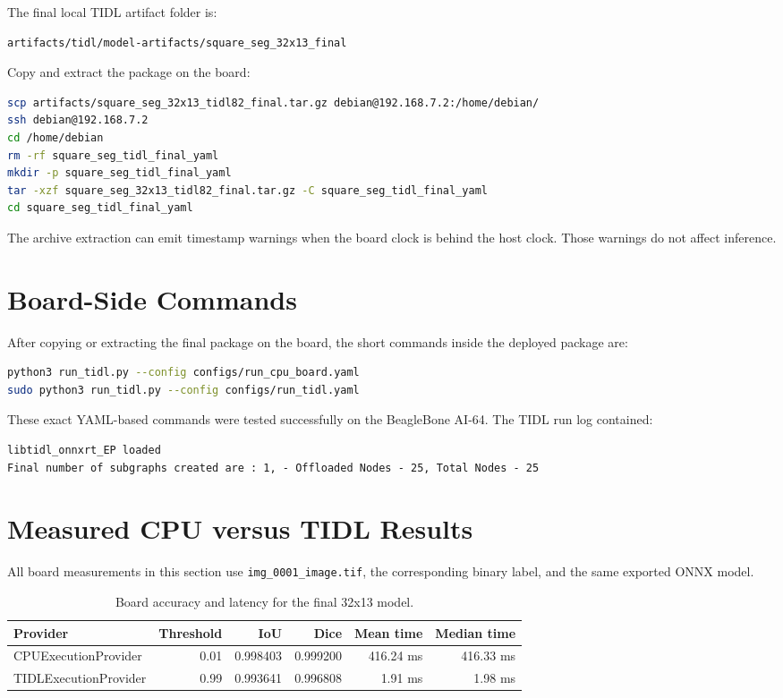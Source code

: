 \documentclass[11pt,a4paper]{article}
\begin{document}
The final local TIDL artifact folder is:

\begin{lstlisting}
artifacts/tidl/model-artifacts/square_seg_32x13_final
\end{lstlisting}

Copy and extract the package on the board:

\begin{lstlisting}[language=bash]
scp artifacts/square_seg_32x13_tidl82_final.tar.gz debian@192.168.7.2:/home/debian/
ssh debian@192.168.7.2
cd /home/debian
rm -rf square_seg_tidl_final_yaml
mkdir -p square_seg_tidl_final_yaml
tar -xzf square_seg_32x13_tidl82_final.tar.gz -C square_seg_tidl_final_yaml
cd square_seg_tidl_final_yaml
\end{lstlisting}

The archive extraction can emit timestamp warnings when the board clock is behind the host clock.  Those warnings do not affect inference.

\section{Board-Side Commands}

After copying or extracting the final package on the board, the short commands inside the deployed package are:

\begin{lstlisting}[language=bash]
python3 run_tidl.py --config configs/run_cpu_board.yaml
sudo python3 run_tidl.py --config configs/run_tidl.yaml
\end{lstlisting}

These exact YAML-based commands were tested successfully on the BeagleBone AI-64.  The TIDL run log contained:

\begin{lstlisting}
libtidl_onnxrt_EP loaded
Final number of subgraphs created are : 1, - Offloaded Nodes - 25, Total Nodes - 25
\end{lstlisting}

\section{Measured CPU versus TIDL Results}

All board measurements in this section use \texttt{img\_0001\_image.tif}, the corresponding binary label, and the same exported ONNX model.

\begin{table}[H]
\centering
\caption{Board accuracy and latency for the final 32x13 model.}
\begin{tabular}{lrrrrr}
\toprule
Provider & Threshold & IoU & Dice & Mean time & Median time \\
\midrule
CPUExecutionProvider & 0.01 & 0.998403 & 0.999200 & 416.24 ms & 416.33 ms \\
TIDLExecutionProvider & 0.99 & 0.993641 & 0.996808 & 1.91 ms & 1.98 ms \\
\bottomrule
\end{tabular}
\end{table}
\end{document}
